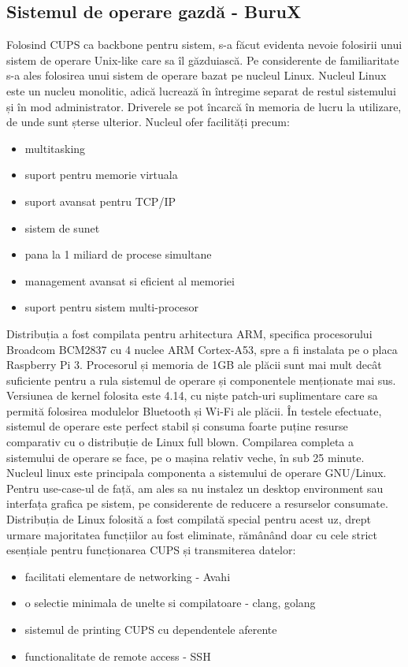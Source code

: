 \documentclass[a4paper, 12pt, twoside]{report}
\begin{document}
		\subsection{Sistemul de operare gazdă - BuruX}
Folosind CUPS ca backbone pentru sistem, s-a făcut evidenta nevoie folosirii unui sistem de operare Unix-like care sa îl găzduiască. Pe considerente de familiaritate s-a ales folosirea unui sistem de operare bazat pe nucleul Linux.
Nucleul Linux este un nucleu monolitic, adică lucrează în întregime separat de restul sistemului și în mod administrator. Driverele se pot încarcă în memoria de lucru la utilizare, de unde sunt șterse ulterior. Nucleul ofer facilități precum:
\begin{itemize}
\item multitasking
\item suport pentru memorie virtuala
\item suport avansat pentru TCP/IP
\item sistem de sunet
\item pana la 1 miliard de procese simultane
\item management avansat si eficient al memoriei
\item suport pentru sistem multi-procesor
\end{itemize}

Distribuția a fost compilata pentru arhitectura ARM, specifica procesorului Broadcom BCM2837 cu 4 nuclee ARM Cortex-A53, spre a fi instalata pe o placa Raspberry Pi 3. Procesorul și memoria de 1GB ale plăcii sunt mai mult decât suficiente pentru a rula sistemul de operare și componentele menționate mai sus. Versiunea de kernel folosita este 4.14, cu niște patch-uri suplimentare care sa permită folosirea modulelor Bluetooth și Wi-Fi ale plăcii. În testele efectuate, sistemul de operare este perfect stabil și consuma foarte puține resurse comparativ cu o distribuție de Linux full blown. Compilarea completa a sistemului de operare se face, pe o mașina relativ veche, în sub 25 minute. Nucleul linux este principala componenta a sistemului de operare GNU/Linux. Pentru use-case-ul de față, am ales sa nu instalez un desktop environment sau interfața grafica pe sistem, pe considerente de reducere a resurselor consumate.
Distribuția de Linux folosită a fost compilată special pentru acest uz, drept urmare majoritatea funcțiilor au fost eliminate, rămânând doar cu cele strict esențiale pentru funcționarea CUPS și transmiterea datelor:
\begin{itemize}
\item facilitati elementare de networking - Avahi
\item o selectie minimala de unelte si compilatoare - clang, golang
\item sistemul de printing CUPS cu dependentele aferente
\item functionalitate de remote access - SSH
\end{itemize}
\end{document}
